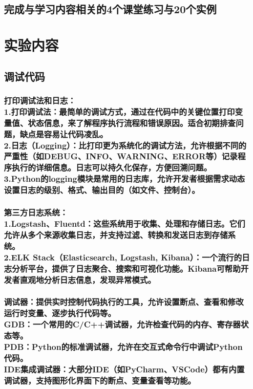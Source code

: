 \documentclass[UTF8,a4paper]{ctexart}
\begin{document}
\begin{sloppypar}
	\subsection{完成与学习内容相关的4个课堂练习与20个实例}

			\bigskip
			\bigskip
			\bigskip
			\bigskip

	\section{实验内容}
	\subsection{调试代码}
	\subsubsection{打印调试法和日志：\\1.打印调试法：最简单的调试方式，通过在代码中的关键位置打印变量值、状态信息，来了解程序执行流程和错误原因。适合初期排查问题，缺点是容易让代码凌乱。\\2.日志（Logging）：比打印更为系统化的调试方法，允许根据不同的严重性（如DEBUG、INFO、WARNING、ERROR等）记录程序执行的详细信息。日志可以持久化保存，方便回溯问题。\\3.Python的logging模块是常用的日志库，允许开发者根据需求动态设置日志的级别、格式、输出目的（如文件、控制台）。}
	\subsubsection{第三方日志系统：\\1.Logstash、Fluentd：这些系统用于收集、处理和存储日志。它们允许从多个来源收集日志，并支持过滤、转换和发送日志到存储系统。\\2.ELK Stack（Elasticsearch, Logstash, Kibana）：一个流行的日志分析平台，提供了日志聚合、搜索和可视化功能。Kibana可帮助开发者直观地分析日志信息，发现异常模式。}
	\subsubsection{调试器：提供实时控制代码执行的工具，允许设置断点、查看和修改运行时变量、逐步执行代码等。\\GDB：一个常用的C/C++调试器，允许检查代码的内存、寄存器状态等。\\PDB：Python的标准调试器，允许在交互式命令行中调试Python代码。\\IDE集成调试器：大部分IDE（如PyCharm、VSCode）都有内置调试器，支持图形化界面下的断点、变量查看等功能。}

\end{sloppypar}
\end{document}
